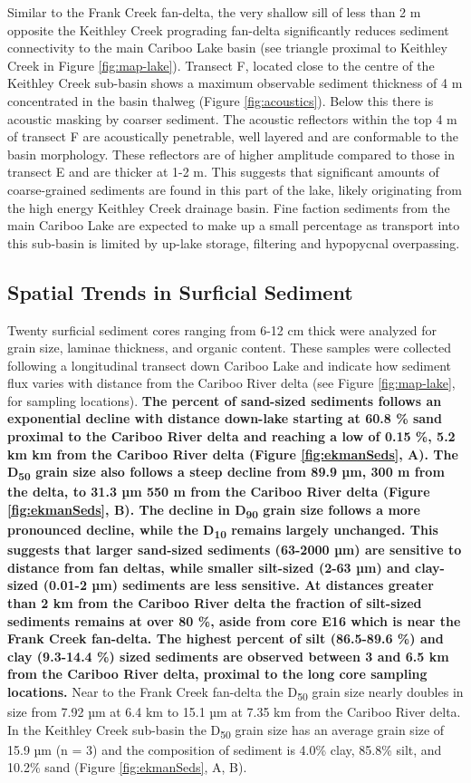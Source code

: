 \documentclass[Royal,times,doublespace,sageh]{sagej}
\begin{document}
Similar to the Frank Creek fan-delta, the very shallow sill of less than
2 m opposite the Keithley Creek prograding fan-delta significantly
reduces sediment connectivity to the main Cariboo Lake basin (see
triangle proximal to Keithley Creek in Figure \ref{fig:map-lake}).
Transect F, located close to the centre of the Keithley Creek sub-basin
shows a maximum observable sediment thickness of 4 m concentrated in the
basin thalweg (Figure \ref{fig:acoustics}). Below this there is acoustic
masking by coarser sediment. The acoustic reflectors within the top 4 m
of transect F are acoustically penetrable, well layered and are
conformable to the basin morphology. These reflectors are of higher
amplitude compared to those in transect E and are thicker at 1-2 m. This
suggests that significant amounts of coarse-grained sediments are found
in this part of the lake, likely originating from the high energy
Keithley Creek drainage basin. Fine faction sediments from the main
Cariboo Lake are expected to make up a small percentage as transport
into this sub-basin is limited by up-lake storage, filtering and
hypopycnal overpassing.

\hypertarget{spatial}{%
\subsection{Spatial Trends in Surficial Sediment}\label{spatial}}

Twenty surficial sediment cores ranging from 6-12 cm thick were analyzed
for grain size, laminae thickness, and organic content. These samples
were collected following a longitudinal transect down Cariboo Lake and
indicate how sediment flux varies with distance from the Cariboo River
delta (see Figure \ref{fig:map-lake}, for sampling locations).
\textbf{The percent of sand-sized sediments follows an exponential
decline with distance down-lake starting at 60.8 \% sand proximal to the
Cariboo River delta and reaching a low of 0.15 \%, 5.2 km km from the
Cariboo River delta (Figure \ref{fig:ekmanSeds}, A). The
D\textsubscript{50} grain size also follows a steep decline from 89.9
µm, 300 m from the delta, to 31.3 µm 550 m from the Cariboo River delta
(Figure \ref{fig:ekmanSeds}, B). The decline in D\textsubscript{90}
grain size follows a more pronounced decline, while the
D\textsubscript{10} remains largely unchanged. This suggests that larger
sand-sized sediments (63-2000 µm) are sensitive to distance from fan
deltas, while smaller silt-sized (2-63 µm) and clay-sized (0.01-2 µm)
sediments are less sensitive. At distances greater than 2 km from the
Cariboo River delta the fraction of silt-sized sediments remains at over
80 \%, aside from core E16 which is near the Frank Creek fan-delta. The
highest percent of silt (86.5-89.6 \%) and clay (9.3-14.4 \%) sized
sediments are observed between 3 and 6.5 km from the Cariboo River
delta, proximal to the long core sampling locations.} Near to the Frank
Creek fan-delta the D\textsubscript{50} grain size nearly doubles in
size from 7.92 µm at 6.4 km to 15.1 µm at 7.35 km from the Cariboo River
delta. In the Keithley Creek sub-basin the D\textsubscript{50} grain
size has an average grain size of 15.9 µm (n = 3) and the composition of
sediment is 4.0\% clay, 85.8\% silt, and 10.2\% sand (Figure
\ref{fig:ekmanSeds}, A, B).
\end{document}
